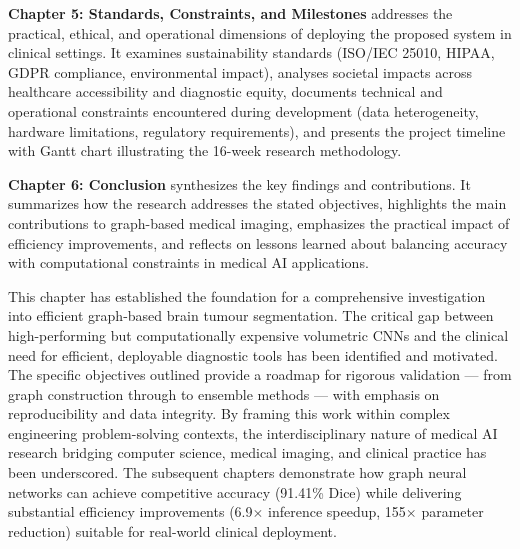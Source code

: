 \textbf{Chapter 5: Standards, Constraints, and Milestones} addresses the practical, ethical, and operational dimensions of deploying the proposed system in clinical settings. It examines sustainability standards (ISO/IEC 25010, HIPAA, GDPR compliance, environmental impact), analyses societal impacts across healthcare accessibility and diagnostic equity, documents technical and operational constraints encountered during development (data heterogeneity, hardware limitations, regulatory requirements), and presents the project timeline with Gantt chart illustrating the 16-week research methodology.

\textbf{Chapter 6: Conclusion} synthesizes the key findings and contributions. It summarizes how the research addresses the stated objectives, highlights the main contributions to graph-based medical imaging, emphasizes the practical impact of efficiency improvements, and reflects on lessons learned about balancing accuracy with computational constraints in medical AI applications.


\vspace{5mm}

This chapter has established the foundation for a comprehensive investigation into efficient graph-based brain tumour segmentation. The critical gap between high-performing but computationally expensive volumetric CNNs and the clinical need for efficient, deployable diagnostic tools has been identified and motivated. The specific objectives outlined provide a roadmap for rigorous validation — from graph construction through to ensemble methods — with emphasis on reproducibility and data integrity. By framing this work within complex engineering problem-solving contexts, the interdisciplinary nature of medical AI research bridging computer science, medical imaging, and clinical practice has been underscored. The subsequent chapters demonstrate how graph neural networks can achieve competitive accuracy (91.41\% Dice) while delivering substantial efficiency improvements (6.9$\times$ inference speedup, 155$\times$ parameter reduction) suitable for real-world clinical deployment.